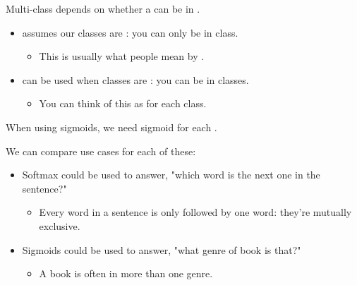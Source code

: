         \begin{clarification}
            Multi-class depends on whether a  can be in .

            \begin{itemize}
                \item {} assumes our classes are : you can only be in  class.
                    \begin{itemize}
                        \item This is usually what people mean by .
                    \end{itemize}

                \item {} can be used when classes are : you can be in  classes.
                    \begin{itemize}
                        \item You can think of this as  for each class.
                    \end{itemize}
            \end{itemize}
            
            When using sigmoids, we need  sigmoid for each .
        \end{clarification}

        \miniex We can compare use cases for each of these:
        
        \begin{itemize}
            \item Softmax could be used to answer, "which word is the next one in the sentence?"
                \begin{itemize}
                    \item Every word in a sentence is only followed by one word: they're mutually exclusive.
                \end{itemize}
            \item Sigmoids could be used to answer, "what genre of book is that?" 
                \begin{itemize}
                    \item A book is often in more than one genre.
                \end{itemize}
        \end{itemize}


